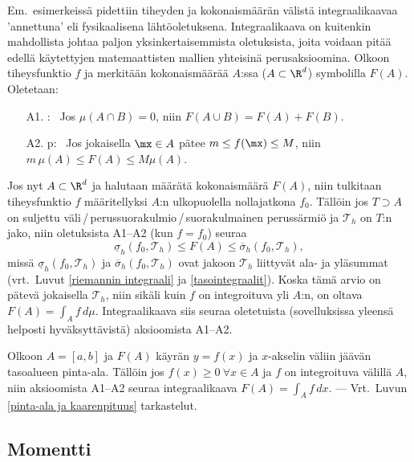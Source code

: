 Em.\ esimerkeissä pidettiin tiheyden ja kokonaismäärän välistä integraalikaavaa
'annettuna' eli fysikaalisena lähtöoletuksena. Integraalikaava on kuitenkin mahdollista 
johtaa paljon yksinkertaisemmista oletuksista, joita voidaan pitää edellä käytettyjen
matemaattisten mallien yhteisinä perusaksioomina. Olkoon tiheysfunktio $f$ ja merkitään
kokonaismäärää $A$:ssa ($A\subset\R^d$) symbolilla $F(A)$. Oletetaan:
\begin{itemize}
\item[A1.] : \ Jos $\mu(A \cap B)=0$, niin $F(A \cup B)=F(A)+F(B)$.
\item[A2.] p: \ Jos jokaisella $\mx \in A$ pätee
           $m \le f(\mx) \le M$, niin \newline $m\,\mu(A) \le F(A) \le M\mu(A)$.
\end{itemize}
Jos nyt $A\subset\R^d$ ja halutaan määrätä kokonaismäärä $F(A)$, niin tulkitaan
tiheysfunktio $f$ määritellyksi $A$:n ulkopuolella nollajatkona $f_0$. Tällöin jos 
$T \supset A$ on suljettu väli\,/\,perussuorakulmio\,/\,suorakulmainen perussärmiö ja
$\mathcal{T}_h$ on $T$:n jako, niin oletuksista A1--A2 (kun $f=f_0$) seuraa
\[
\underline{\sigma}_h(f_0,\mathcal{T}_h) \le F(A) \le \overline{\sigma}_h(f_0,\mathcal{T}_h),
\]
missä $\underline{\sigma}_h(f_0,\mathcal{T}_h)$ ja $\overline{\sigma}_h(f_0,\mathcal{T}_h)$
ovat jakoon $\mathcal{T}_h$ liittyvät ala- ja yläsummat 
(vrt.\ Luvut \ref{riemannin integraali} ja \ref{tasointegraalit}). Koska tämä arvio on pätevä
jokaisella $\mathcal{T}_h$, niin sikäli kuin $f$ on integroituva yli $A$:n, on oltava
$F(A) = \int_A f\,d\mu$. Integraalikaava siis seuraa oletetuista (sovelluksissa yleensä
helposti hyväksyttävistä) aksioomista A1--A2.
\begin{Exa} Olkoon $A=[a,b]$ ja $F(A)$ käyrän $y=f(x)$ ja $x$-akselin väliin
jäävän tasoalueen pinta-ala. Tällöin jos $f(x) \ge 0\ \forall x \in A$ ja $f$ on 
integroituva välillä $A$, niin aksioomista A1--A2 seuraa integraalikaava 
$F(A)=\int_A f\,dx$. --- Vrt.\ Luvun \ref{pinta-ala ja kaarenpituus} tarkastelut.
\end{Exa} 

\subsection*{Momentti}

